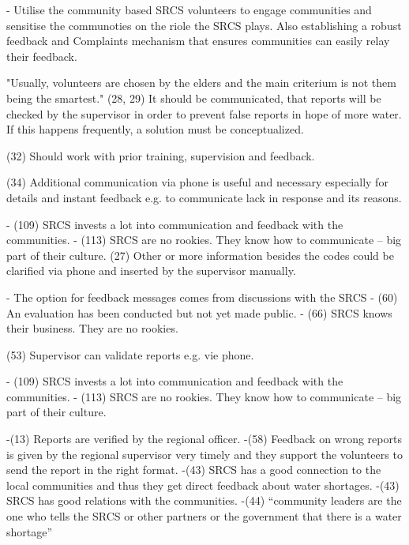 





-	Utilise the community based SRCS volunteers to engage communities and sensitise the communoties on the riole the SRCS plays. Also establishing a robust feedback and Complaints mechanism that ensures communities can easily relay their feedback.





"Usually, volunteers are chosen by the elders and the main criterium is not them being the smartest."
(28, 29) It should be communicated, that reports will be checked by the supervisor in order to prevent false reports in hope of more water. If this happens frequently, a solution must be conceptualized.

(32) Should work with prior training, supervision and feedback.

(34) Additional communication via phone is useful and necessary especially for details and instant feedback e.g. to communicate lack in response and its reasons.

-	(109) SRCS invests a lot into communication and feedback with the communities.
-	(113) SRCS are no rookies. They know how to communicate – big part of their culture.
(27) Other or more information besides the codes could be clarified via phone and inserted by the supervisor manually.

-	The option for feedback messages comes from discussions with the SRCS
-	(60) An evaluation has been conducted but not yet made public.
-	(66) SRCS knows their business. They are no rookies.

(53) Supervisor can validate reports e.g. vie phone.

-	(109) SRCS invests a lot into communication and feedback with the communities.
-	(113) SRCS are no rookies. They know how to communicate – big part of their culture.



-(13) Reports are verified by the regional officer.
-(58) Feedback on wrong reports is given by the regional supervisor very timely and they support the volunteers to send the report in the right format.
-(43) SRCS has a good connection to the local communities and thus they get direct feedback about water shortages.
-(43) SRCS has good relations with the communities.
-(44) “community leaders are the one who tells the SRCS or other partners or the government that there is a water shortage”


